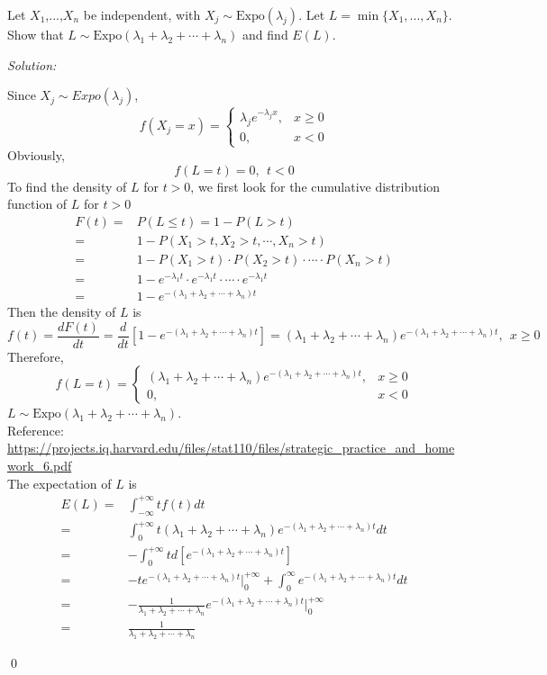 \documentclass[12pt]{article}
\newenvironment{problem}[2][Problem]{\begin{trivlist}
\item[\hskip \labelsep {\bfseries #1}\hskip \labelsep {\bfseries #2.}]}{\end{trivlist}}
\newenvironment{sol}
    {\emph{Solution:}
    }
    {
    \qed
    }
\begin{document}
\begin{problem}{9}
Let $X_1$,...,$X_n$ be independent, with $X_j\sim \text{Expo}(\lambda_j)$. Let $L=\min\{X_1,...,X_n\}$. Show that $L\sim \text{Expo}(\lambda_1+\lambda_2+\cdots+\lambda_n)$ and find $E(L)$.
\end{problem}
\begin{sol}
Since $X_j\sim Expo(\lambda_j)$,
\[
f(X_j=x)=
\left\{\begin{array}{ll}
\lambda_je^{-\lambda_jx},&x\geq0\\
0,&x<0
\end{array}\right.
\]
Obviously,
\[
f(L=t)=0,~~t<0
\]
To find the density of $L$ for $t>0$, we first look for the cumulative distribution function of $L$ for $t>0$
\begin{align*}
F(t)=&P(L\leq t)=1-P(L>t)\\
=&1-P(X_1>t,X_2>t,\cdots,X_n>t)\\
=&1-P(X_1>t)\cdot P(X_2>t)\cdot\cdots\cdot P(X_n>t)\\
=&1-e^{-\lambda_1t}\cdot e^{-\lambda_1t}\cdot\cdots\cdot e^{-\lambda_1t}\\
=&1-e^{-(\lambda_1+\lambda_2+\cdots+\lambda_n)t}
\end{align*}
Then the density of $L$ is
\[
f(t)=\frac{dF(t)}{dt}=\frac{d}{dt}[1-e^{-(\lambda_1+\lambda_2+\cdots+\lambda_n)t}]=(\lambda_1+\lambda_2+\cdots+\lambda_n)e^{-(\lambda_1+\lambda_2+\cdots+\lambda_n)t},~~x\geq0
\]
Therefore,
\[
f(L=t)=
\left\{\begin{array}{ll}
(\lambda_1+\lambda_2+\cdots+\lambda_n)e^{-(\lambda_1+\lambda_2+\cdots+\lambda_n)t},&x\geq0\\
0,&x<0
\end{array}\right.
\]
$L\sim \text{Expo}(\lambda_1+\lambda_2+\cdots+\lambda_n)$.\\
\footnotesize Reference:\\
\url{https://projects.iq.harvard.edu/files/stat110/files/strategic_practice_and_homework_6.pdf}\normalsize\\
The expectation of $L$ is
\begin{align*}
E(L)=&\int_{-\infty}^{+\infty}tf(t)dt\\
=&\int_0^{+\infty}t(\lambda_1+\lambda_2+\cdots+\lambda_n)e^{-(\lambda_1+\lambda_2+\cdots+\lambda_n)t}dt\\
=&-\int_0^{+\infty}td[e^{-(\lambda_1+\lambda_2+\cdots+\lambda_n)t}]\\
=&-te^{-(\lambda_1+\lambda_2+\cdots+\lambda_n)t}|_0^{+\infty}+\int_0^{\infty}e^{-(\lambda_1+\lambda_2+\cdots+\lambda_n)t}dt\\
=&-\frac{1}{\lambda_1+\lambda_2+\cdots+\lambda_n}e^{-(\lambda_1+\lambda_2+\cdots+\lambda_n)t}|_0^{+\infty}\\
=&\frac{1}{\lambda_1+\lambda_2+\cdots+\lambda_n}
\end{align*}
\end{sol}
\end{document}
